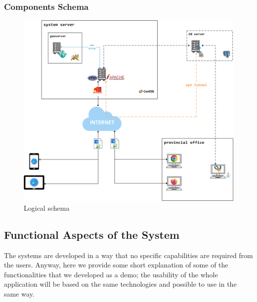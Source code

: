 \subsubsection{Components Schema}
\begin{figure}[H]
    \includegraphics[width=\textwidth]{img/system}
    \caption{Logical schema}
    \label{LogicalSchema}
\end{figure}

\subsection{Functional Aspects of the System}
The systems are developed in a way that no specific capabilities are required from the users.
Anyway, here we provide some short explanation of some of the functionalities that we developed as a demo; the usability of the whole application will be based on the same technologies and possible to use in the same way. 
